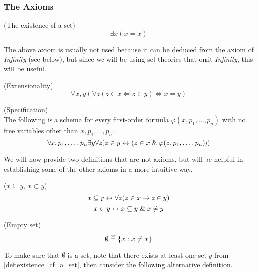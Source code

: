 \subsubsection{The Axioms}

\begin{definition}{(The existence of a set)}\label{def:existence_of_a_set}
\begin{equation}
\exists x (x = x)
\end{equation}
\end{definition}
The above axiom is usually not used because it can be deduced from the axiom of \emph{Infinity} (see below), but since we will be using set theories that omit \emph{Infinity}, this will be useful.

\begin{definition}{(Extensionality)}\label{def:extensionality}
\begin{equation}
\forall x, y(\forall z (z \in x \iff z \in y) \iff x = y)
\end{equation}
\end{definition}

\begin{definition}{(Specification)}\label{def:specification}\\
The following is a schema for every first-order formula $\varphi(x, p_1, \ldots, p_n)$ with no free variables other than $x, p_1, \ldots, p_n$.
\begin{equation}
\forall x, p_1, \ldots, p_n \exists y \forall z ( z \in y \leftrightarrow ( z \in x \mathrel{\&} \varphi(z, p_1, \ldots, p_n)))
\end{equation}
\end{definition}

We will now provide two definitions that are not axioms, but will be helpful in establishing some of the other axioms in a more intuitive way.
\begin{definition}{($x \subseteq y$, $x \subset y$)}
\begin{equation}
x \subseteq y \leftrightarrow \forall z(z \in x \rightarrow z \in y)
\end{equation}
\begin{equation}
x \subset y \leftrightarrow x \subseteq y \mathrel{\&} x \neq y
\end{equation}
\end{definition}

\begin{definition}{(Empty set)}\label{def:emptyset}
\begin{equation}
\emptyset \defeq \{x : x \neq x\}
\end{equation}
\end{definition}
To make sure that $\emptyset$ is a set, note that there exists at least one set $y$ from \ref{def:existence_of_a_set}, then consider the following alternative definition.

